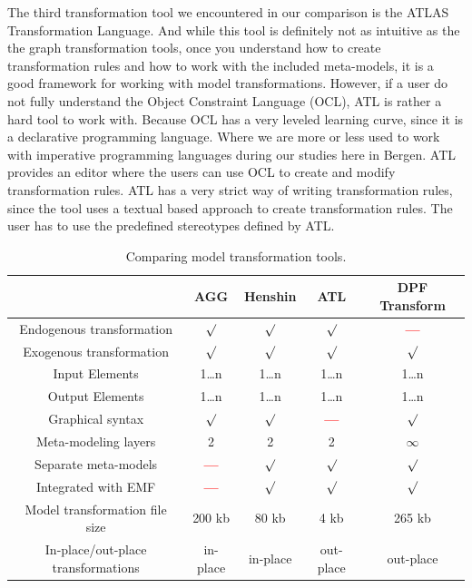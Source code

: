The third transformation tool we encountered in our comparison is the ATLAS
Transformation Language. And while this tool is definitely not as intuitive as
the the graph transformation tools, once you understand how to create
transformation rules and how to work with the included meta-models, it is a
good framework for working with model transformations. However, if a user do
not fully understand the Object Constraint Language (OCL), ATL is rather a hard
tool to work with. Because OCL has a very leveled learning curve, since it is a
declarative programming language. Where we are more or less used to work with
imperative programming languages during our studies here in Bergen. ATL
provides an editor where the users can use OCL to create and modify
transformation rules. ATL has a very strict way of writing transformation
rules, since the tool uses a textual based approach to create transformation
rules. The user has to use the predefined stereotypes defined by ATL.


\begin{table}[ht]
\renewcommand*\arraystretch{1.2}
\centering
\begin{tabular}{| c | c | c | c | c |}
\hline
& AGG & Henshin & ATL & DPF Transform \\
\hline
Endogenous transformation & $\surd$ & $\surd$ & $\surd$ & \textcolor{red}{\textbf{---}}\\

Exogenous transformation & $\surd$ & $\surd$ & $\surd$ & $\surd$\\

Input Elements & 1\ldots n & 1\ldots n & 1\ldots n & 1\ldots n\\

Output Elements & 1\ldots n & 1\ldots n & 1\ldots n & 1\ldots n\\

Graphical syntax & $\surd$ & $\surd$ & \textcolor{red}{\textbf{---}} & $\surd$
\\

Meta-modeling layers & 2 & 2 & 2 & $\infty$ \\

Separate meta-models & \textcolor{red}{\textbf{---}} &  $\surd$ &  $\surd$ &  $\surd$ \\

Integrated with EMF & \textcolor{red}{\textbf{---}} & $\surd$ & $\surd$ & $\surd$ \\ 

Model transformation file size & 200 kb & 80 kb & 4 kb & 265 kb\\

In-place/out-place transformations & in-place &
in-place & out-place  & out-place \\

\hline
\end{tabular}
\caption{Comparing model transformation tools.}
\label{tab:comparing}
\end{table} 

